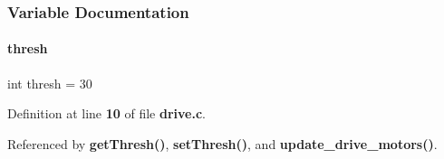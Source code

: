 \subsubsection{Variable Documentation}
\mbox{\label{drive_8c_a6cf8bf160a02413bc3d5d18b0294b581}} 
\paragraph{thresh}
{\footnotesize\ttfamily int thresh = 30\hspace{0.3cm}{\ttfamily [static]}}



Definition at line \textbf{ 10} of file \textbf{ drive.\+c}.



Referenced by \textbf{ get\+Thresh()}, \textbf{ set\+Thresh()}, and \textbf{ update\+\_\+drive\+\_\+motors()}.


